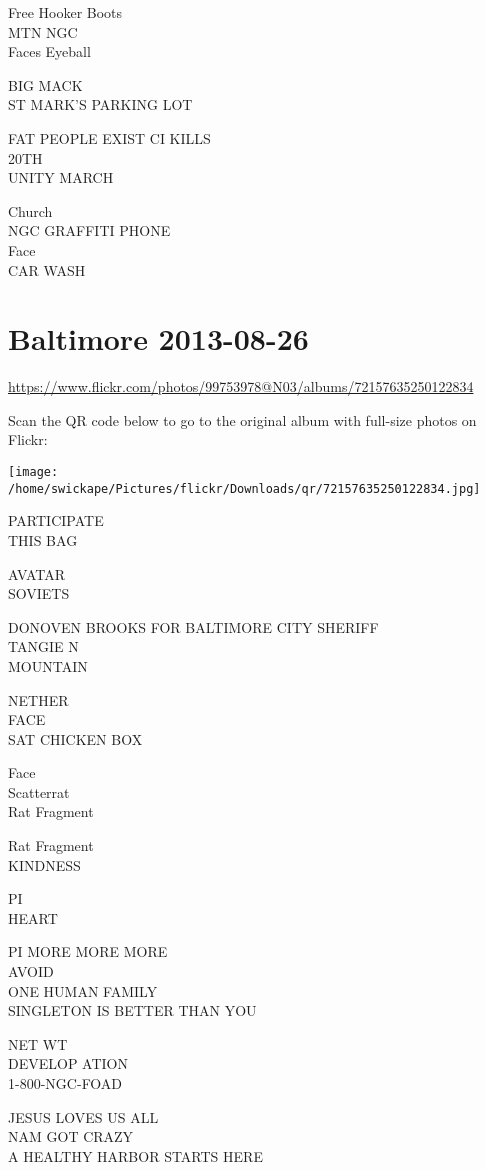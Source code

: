 \documentclass[10pt,letterpaper]{article}
\begin{document}
Free Hooker Boots\\
MTN NGC\\
Faces Eyeball

BIG MACK\\
ST MARK'S PARKING LOT

FAT PEOPLE EXIST CI KILLS\\
20TH\\
UNITY MARCH

Church\\
NGC GRAFFITI PHONE\\
Face\\
CAR WASH
\pagebreak

\section*{Baltimore 2013-08-26}

\url{https://www.flickr.com/photos/99753978@N03/albums/72157635250122834}

Scan the QR code below to go to the original album with full-size photos on Flickr:

\texttt{[image: /home/swickape/Pictures/flickr/Downloads/qr/72157635250122834.jpg]}
\pagebreak

PARTICIPATE\\
THIS BAG

AVATAR\\
SOVIETS

DONOVEN BROOKS FOR BALTIMORE CITY SHERIFF\\
TANGIE N\\
MOUNTAIN

NETHER\\
FACE\\
SAT CHICKEN BOX

Face\\
Scatterrat\\
Rat Fragment

Rat Fragment\\
KINDNESS

PI\\
HEART

PI MORE MORE MORE\\
AVOID\\
ONE HUMAN FAMILY\\
SINGLETON IS BETTER THAN YOU

NET WT\\
DEVELOP ATION\\
1{-}800{-}NGC{-}FOAD

JESUS LOVES US ALL\\
NAM GOT CRAZY\\
A HEALTHY HARBOR STARTS HERE
\end{document}
